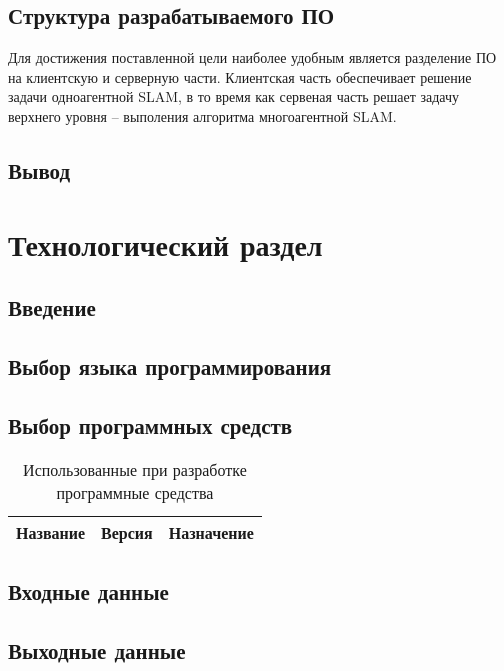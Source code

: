 \subsection{Структура разрабатываемого ПО}
Для достижения поставленной цели наиболее удобным является разделение ПО на клиентскую и серверную части. Клиентская часть обеспечивает решение задачи одноагентной SLAM, в то время как сервеная часть решает задачу верхнего уровня -- выполения алгоритма многоагентной SLAM.


\subsection{Вывод}



\section{Технологический раздел}
\subsection{Введение}
\subsection{Выбор языка программирования}
\subsection{Выбор программных средств}

\begin{table}[h]
    \caption{Использованные при разработке программные средства}
    \centering
    \begin{tabu}{|>{\centering}p{3.5cm}|>{\centering}p{2.3cm}|X[c]|}
    	\hline
    	Название                         & Версия           & 
    	Назначение                                                \\ \hline
    	\hline
    \end{tabu}
    \label{tab:software}
\end{table}

\subsection{Входные данные}

\subsection{Выходные данные}

